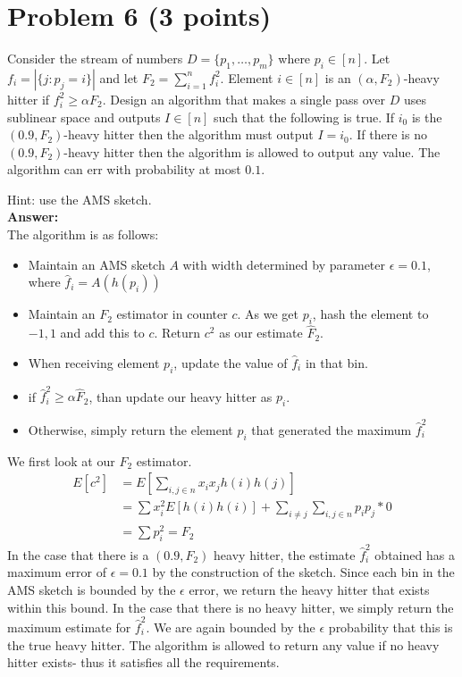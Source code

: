 \documentclass[letterpaper, 11pt]{article}
\begin{document}
\pagebreak
\section*{Problem 6 (3 points)}
Consider the stream of numbers $D=\{p_1,\dots,p_m\}$ where $p_i \in [n]$. Let $f_i = |\{j: p_j = i\}|$ and let $F_2 = \sum_{i=1}^n f_i^2$.
Element $i\in [n]$ is an $(\alpha,F_2)$-heavy hitter if $f_i^2 \ge \alpha F_2$. 
Design an algorithm that makes a single pass over $D$ uses sublinear space and outputs $I\in [n]$ such that the following is true. 
If $i_0$ is the $(0.9, F_2)$-heavy hitter then the algorithm must output $I = i_0$.
If there is no $(0.9, F_2)$-heavy hitter then the algorithm is allowed to output any value. 
The algorithm can err with probability at most $0.1$.

Hint: use the AMS sketch. \\
\textbf{Answer:} \\
The algorithm is as follows:
\begin{itemize}
	\item Maintain an AMS sketch $A$ with width determined by parameter $\epsilon = 0.1$, where $\hat f_i = A(h(p_i))$
	\item Maintain an $F_2$ estimator in counter $c$. As we get $p_i$, hash the element to ${-1, 1}$ and add this to $c$. Return $c^2$ as our estimate $\hat F_2$.
	\item When receiving element $p_i$, update the value of $\hat f_i$ in that bin.
	\item if $\hat f_i^2 \geq \alpha \hat F_2$, than update our heavy hitter as $p_i$.
	\item Otherwise, simply return the element $p_i$ that generated the maximum $\hat f_i^2$
\end{itemize}
We first look at our $F_2$ estimator.
\begin{align}
E[c^2] &= E \left[\sum_{i,j \in n}x_ix_jh(i)h(j)\right] \\
&= \sum x_i^2E[h(i)h(i)] + \sum_{i \neq j}\sum_{i,j \in n} p_ip_j * 0 \\
&= \sum p_i^2 = F_2
\end{align}
In the case that there is a $(0.9, F_2)$ heavy hitter, the estimate $\hat f_i^2$ obtained has a maximum error of $\epsilon=0.1$ by the construction of the sketch. Since each bin in the AMS sketch is bounded by the $\epsilon$ error, we return the heavy hitter that exists within this bound. In the case that there is no heavy hitter, we simply return the maximum estimate for $\hat f_i^2$. We are again bounded by the $\epsilon$ probability that this is the true heavy hitter. The algorithm is allowed to return any value if no heavy hitter exists- thus it satisfies all the requirements.
\end{document}
